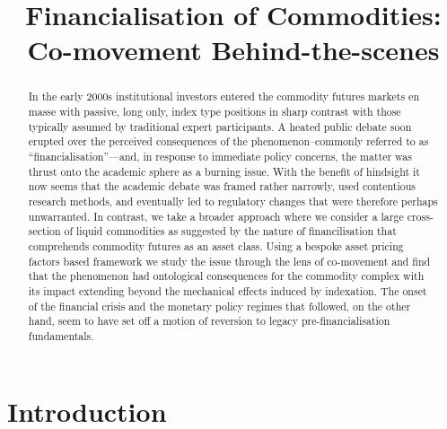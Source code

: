 \documentclass[]{elsarticle} %
\begin{document}
\begin{frontmatter}

  \title{Financialisation of Commodities: Co-movement Behind-the-scenes}
      
  \begin{abstract}
  In the early 2000s institutional investors entered the commodity futures markets en masse with passive, long only, index type positions in sharp contrast with those typically assumed by traditional expert participants. A heated public debate soon erupted over the perceived consequences of the phenomenon--commonly referred to as ``financialisation''---and, in response to immediate policy concerns, the matter was thrust onto the academic sphere as a burning issue. With the benefit of hindsight it now seems that the academic debate was framed rather narrowly, used contentious research methods, and eventually led to regulatory changes that were therefore perhaps unwarranted. In contrast, we take a broader approach where we consider a large cross-section of liquid commodities as suggested by the nature of financilisation that comprehends commodity futures as an asset class. Using a bespoke asset pricing factors based framework we study the issue through the lens of co-movement and find that the phenomenon had ontological consequences for the commodity complex with its impact extending beyond the mechanical effects induced by indexation. The onset of the financial crisis and the monetary policy regimes that followed, on the other hand, seem to have set off a motion of reversion to legacy pre-financialisation fundamentals.
  \end{abstract}
  
 \end{frontmatter}

\restoregeometry

\cleardoublepage

\hypertarget{index}{%
\section{Introduction}\label{index}}
\end{document}
